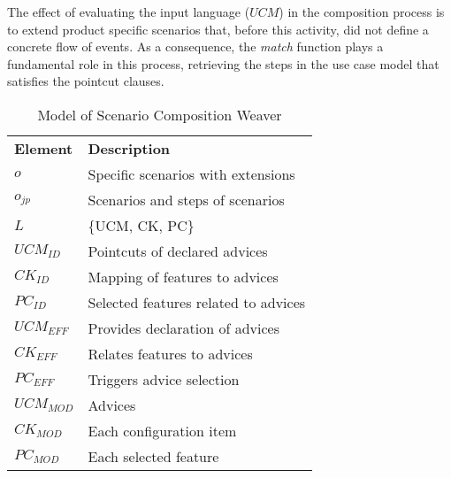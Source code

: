 The effect of evaluating the input language ($UCM$) in the composition process is to extend product specific scenarios that, before this activity, did not define a concrete flow of events. As a consequence, the \emph{match} function
plays a fundamental role in this process, retrieving the steps in the use case model that satisfies the pointcut clauses.

\begin{table}[hbt]
\begin{center}
\caption{Model of Scenario Composition Weaver} \label{tab:sc-weaver}
\begin{tabular}{p{0.4in}p{2.6in}}
   \hline\noalign{\smallskip}
  {\bf Element} & {\bf Description} \\
   \noalign{\smallskip}
   \hline
   \noalign{\smallskip}
   $o$               & Specific scenarios with extensions  \\
   $o_{jp}$          & Scenarios and steps of scenarios \\
   $L$               & \{UCM, CK, PC\} \\
   $UCM_{ID}$        & Pointcuts of declared advices \\
   $CK_{ID}$         & Mapping of features to advices \\
   $PC_{ID}$          & Selected features related to advices  \\
   $UCM_{EFF}$       & Provides declaration of advices  \\
   $CK_{EFF}$        & Relates features to advices \\
   $PC_{EFF}$    	 & Triggers advice selection \\
   $UCM_{MOD}$       & Advices \\
   $CK_{MOD}$        & Each configuration item \\
   $PC_{MOD}$        & Each selected feature \\
  \hline
  \end{tabular}
\end{center}
\end{table}


